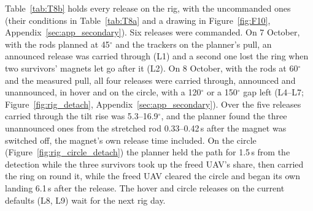 Table~\ref{tab:T8b} holds every release on the rig, with the uncommanded ones (their conditions in
Table~\ref{tab:T8a} and a drawing in Figure~\ref{fig:F10}, Appendix~\ref{sec:app_secondary}). Six releases were commanded. On 7 October, with the rods planned at 45$^\circ$ and
the trackers on the planner's pull, an announced release was carried through (L1) and a second one lost the ring
when two survivors' magnets let go after it (L2). On 8 October, with the rods at 60$^\circ$ and the measured pull, all
four releases were carried through, announced and unannounced, in hover and on the circle, with a 120$^\circ$ or a
150$^\circ$ gap left (L4--L7; Figure~\ref{fig:rig_detach}, Appendix~\ref{sec:app_secondary}). Over the five releases carried through the tilt rise was
5.3--16.9$^\circ$, and the planner found the three unannounced ones from the stretched rod 0.33--0.42\,s after the
magnet was switched off, the magnet's own release time included. On the circle (Figure~\ref{fig:rig_circle_detach})
the planner held the path for 1.5\,s from the detection while the three survivors took up the freed UAV's share, then
carried the ring on round it, while the freed UAV cleared the circle and began its own landing 6.1\,s after the
release. The hover and circle releases on the current defaults (L8, L9) wait for the next rig day.



